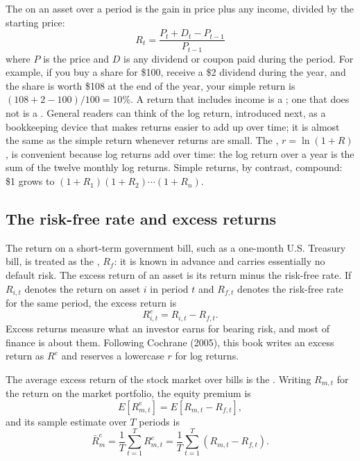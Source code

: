 The  on an asset over a period is the gain in price plus any income, divided by the starting price:
\begin{equation}
  R_t = \frac{P_t + D_t - P_{t-1}}{P_{t-1}}
  \label{eq:01-return}
\end{equation}
where $P$ is the price and $D$ is any dividend or coupon paid during the period. For example, if you buy a share for \$100, receive a \$2 dividend during the year, and the share is worth \$108 at the end of the year, your simple return is $(108 + 2 - 100)/100 = 10$\%. A return that includes income is a ; one that does not is a . General readers can think of the log return, introduced next, as a bookkeeping device that makes returns easier to add up over time; it is almost the same as the simple return whenever returns are small. The , $r = \ln(1 + R)$, is convenient because log returns add over time: the log return over a year is the sum of the twelve monthly log returns. Simple returns, by contrast, compound: \$1 grows to $(1 + R_1)(1 + R_2)\cdots(1 + R_n)$.

\subsection{The risk-free rate and excess returns}
\label{sec:01-rf}

The return on a short-term government bill, such as a one-month U.S. Treasury bill, is treated as the , $R_f$: it is known in advance and carries essentially no default risk. 
The excess return of an asset is its return minus the risk-free rate. If $R_{i,t}$ denotes the return on asset $i$ in period $t$ and $R_{f,t}$ denotes the risk-free rate for the same period, the excess return is
\begin{equation}
R^{e}_{i,t} = R_{i,t} - R_{f,t}.
\label{eq:excess-return}
\end{equation}
Excess returns measure what an investor earns for bearing risk, and most of finance is about them. Following Cochrane (2005), this book writes an excess return as $R^{e}$ and reserves a lowercase $r$ for log returns.

The average excess return of the stock market over bills is the . Writing $R_{m,t}$ for the return on the market portfolio, the equity premium is
\begin{equation}
E\left[R^{e}_{m,t}\right] = E\left[R_{m,t} - R_{f,t}\right],
\label{eq:equity-premium}
\end{equation}
and its sample estimate over $T$ periods is
\begin{equation}
\bar{R}^{e}_{m} = \frac{1}{T}\sum_{t=1}^{T} R^{e}_{m,t} = \frac{1}{T}\sum_{t=1}^{T}\left(R_{m,t} - R_{f,t}\right).
\label{eq:equity-premium-sample}
\end{equation}




